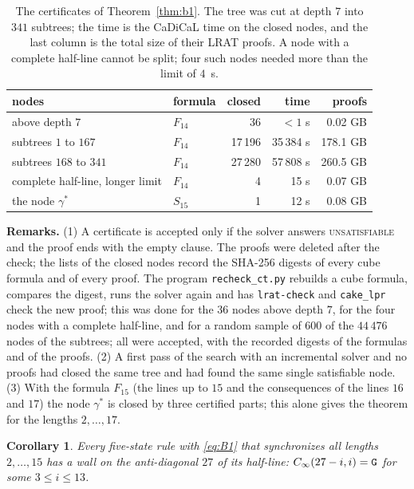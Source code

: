 \documentclass[11pt]{article}
\newtheorem{corollary}[lemma]{Corollary}
\theoremstyle{remark}
\begin{document}
\begin{table}[ht]
\centering\small
\caption{The certificates of Theorem~\ref{thm:b1}. The tree was cut at depth $7$ into $341$ subtrees; the time
is the CaDiCaL time on the closed nodes, and the last column is the total size of their LRAT proofs. A node
with a complete half-line cannot be split; four such nodes needed more than the limit of $4$~s.}\label{tab:b1}
\begin{tabular}{llrrr}
\toprule
nodes & formula & closed & time & proofs\\
\midrule
above depth $7$ & $F_{14}$ & 36 & $<1$ s & 0.02 GB\\
subtrees $1$ to $167$ & $F_{14}$ & 17\,196 & 35\,384 s & 178.1 GB\\
subtrees $168$ to $341$ & $F_{14}$ & 27\,280 & 57\,808 s & 260.5 GB\\
complete half-line, longer limit & $F_{14}$ & 4 & 15 s & 0.07 GB\\
the node $\gamma^\ast$ & $S_{15}$ & 1 & 12 s & 0.08 GB\\
\bottomrule
\end{tabular}
\end{table}

\noindent\textbf{Remarks.} (1) A certificate is accepted only if the solver answers \textsc{unsatisfiable}
and the proof ends with the empty clause. The proofs were deleted after the check; the lists of the closed
nodes record the SHA-256 digests of every cube formula and of every proof. The program
\texttt{recheck\_ct.py} rebuilds a cube formula, compares the digest, runs the solver again and has
\texttt{lrat-check} and \texttt{cake\_lpr} check the new proof; this was done for the $36$ nodes above depth
$7$, for the four nodes with a complete half-line, and for a random sample of $600$ of the $44\,476$ nodes of
the subtrees; all were accepted, with the recorded digests of the formulas and of the proofs.
(2) A first pass of the search with an incremental solver and no proofs had closed the same tree and had
found the same single satisfiable node.
(3) With the formula $F_{15}$ (the lines up to $15$ and the consequences of the lines $16$ and $17$) the node
$\gamma^\ast$ is closed by three certified parts; this alone gives the theorem for the lengths $2,\dots,17$.

\begin{corollary}\label{cor:fifteen}
Every five-state rule with \eqref{eq:B1} that synchronizes all lengths $2,\dots,15$ has a wall on the
anti-diagonal $27$ of its half-line: $C_\infty(27-i,i)=\mathtt{G}$ for some $3\le i\le13$.
\end{corollary}
\end{document}
